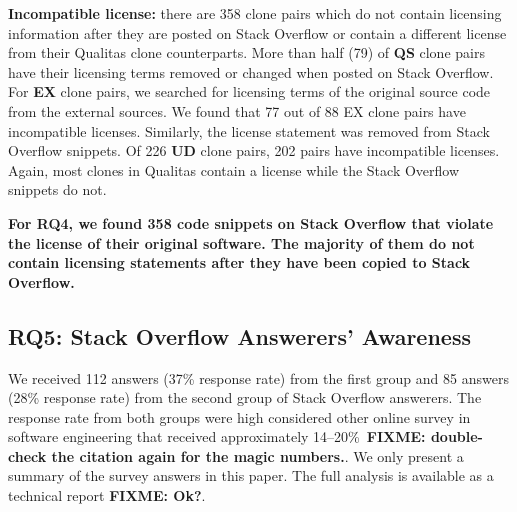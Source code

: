 \documentclass[10pt,journal,compsoc]{IEEEtran}
\newcommand\FIXME[1]{{\color{red}\textbf{FIXME: #1}}}
\begin{document}
\textbf{Incompatible license:} there are 358 clone pairs which do not
contain licensing information after they are posted on Stack Overflow
or contain a different license from their Qualitas clone
counterparts. More than half (79) of \textbf{QS} clone pairs have
their licensing terms removed or changed when posted on Stack
Overflow. For \textbf{EX} clone pairs, we searched for licensing terms of the
original source code from the external sources. We found that 77 out
of 88 EX clone pairs have incompatible licenses.
Similarly, the license statement was removed from Stack Overflow
snippets. Of 226 \textbf{UD} clone pairs, 202 pairs have incompatible
licenses. Again, most clones in Qualitas contain a license
while the Stack Overflow snippets do not.
%

\textbf{For RQ4, we found 358 code snippets on Stack Overflow that
	violate the license of their original software. The majority of them
	do not contain licensing statements after they have been copied to
	Stack Overflow.}

\subsection{RQ5: Stack Overflow Answerers' Awareness}

We received 112 answers (37\% response rate) from the first group and 85 answers
(28\% response rate) from the second group of Stack Overflow answerers. The response
rate from both groups were high considered other online survey in software
engineering that received approximately 14--20\%~\FIXME{double-check the
	citation again for the magic numbers.}\cite{Punter2003}.
We only present a summary of the survey answers in this paper. The full analysis
is available as a technical report \FIXME{Ok?}.
\end{document}
